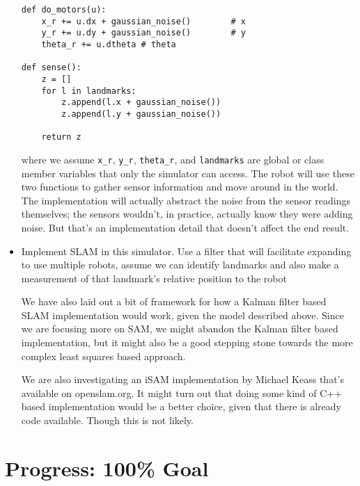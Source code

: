 \documentclass[11pt]{article}
\begin{document}
\begin{itemize}
\begin{verbatim}
def do_motors(u):
    x_r += u.dx + gaussian_noise()        # x
    y_r += u.dy + gaussian_noise()        # y
    theta_r += u.dtheta # theta

def sense():
    z = []
    for l in landmarks:
        z.append(l.x + gaussian_noise())
        z.append(l.y + gaussian_noise())
        
    return z
\end{verbatim}
where we assume \texttt{x\_r}, \texttt{y\_r}, \texttt{theta\_r}, and \texttt{landmarks} are global or class member variables that only the simulator can access. The robot will use these two functions to gather sensor information and move around in the world. The implementation
will actually abstract the noise from the sensor readings themselves; the sensors wouldn't, in practice, actually know they were adding
noise. But that's an implementation detail that doesn't affect the end result. 
        
    \item Implement SLAM in this simulator. Use a filter that will facilitate expanding to use multiple robots, assume we can identify landmarks and also make a measurement of that landmark's relative position to the robot

We have also laid out a bit of framework for how a Kalman filter based SLAM implementation would work, given the model described above. Since we are focusing more on SAM, we might abandon the Kalman filter based implementation, but it might also be a good stepping stone towards the more complex least squares based approach. 

We are also investigating an iSAM implementation by Michael Keass \cite{isam1} that's available on openslam.org. It might turn out that doing some kind of C++ based implementation would be a better choice, given that there is already code available. Though this is not likely.

\end{itemize}
\section{Progress: 100\% Goal}
\end{document}
